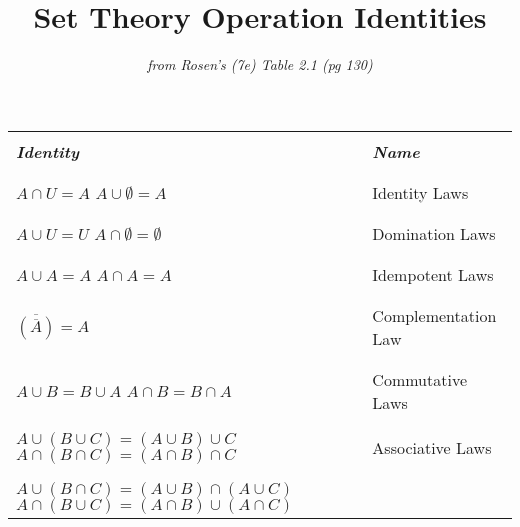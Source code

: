 \documentclass{article}
\title{Set Theory Operation Identities}
\author{\textit{from Rosen's (7e) Table 2.1 (pg 130)}}
\date{}
\begin{document}
\maketitle

\flushleft
\begin{center}
\begin{tabular}{|l|l|}
    \hline
    &\\[-5pt]
    \textbf{\textit{Identity}}
        & \textbf{\textit{Name}}\\
    &\\[-5pt]
    \hline \hline
    &\\[-5pt]
    \parbox[t]{5cm}{$A\cap U = A$\\$A \cup \emptyset = A$}
        & \parbox[t]{5cm}{Identity Laws}\\
    &\\[-5pt]
    \hline
    &\\[-5pt]
    \parbox[t]{5cm}{$A\cup U = U$\\$A \cap \emptyset = \emptyset$}
        & \parbox[t]{5cm}{Domination Laws}\\
    &\\[-5pt]
    \hline
    &\\[-5pt]
    \parbox[t]{5cm}{$A\cup A = A$\\$A \cap A = A$}
        & \parbox[t]{5cm}{Idempotent Laws}\\
    &\\[-5pt]
    \hline
    &\\[-5pt]
    \parbox[t]{5cm}{$\overline{\left(\overline{A}\right)}= A$}
        & \parbox[t]{5cm}{Complementation Law}\\
    &\\[-5pt]
    \hline
    &\\[-5pt]
    \parbox[t]{5cm}{$A\cup B = B \cup A$\\$A \cap B = B \cap A$}
        & \parbox[t]{5cm}{Commutative Laws}\\
    &\\[-5pt]
    \hline
    &\\[-5pt]
    \parbox[t]{5cm}{$A\cup (B \cup C) = (A \cup B) \cup C$\\$A\cap (B \cap C) = (A \cap B) \cap C$}
        & \parbox[t]{5cm}{Associative Laws}\\
    &\\[-5pt]
    \hline
    &\\[-5pt]
    \parbox[t]{5cm}{$A\cup (B \cap C) = (A \cup B) \cap (A \cup C)$\\$A\cap (B \cup C) = (A \cap B) \cup (A \cap C)$}

\end{tabular}
\end{center}
\end{document}
